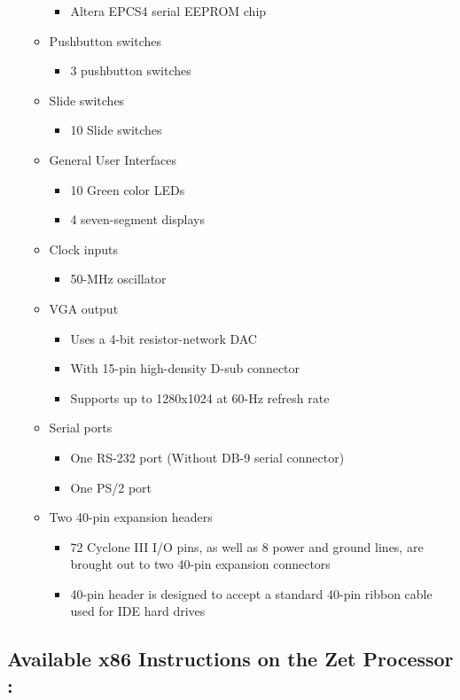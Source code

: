 \documentclass[conference]{IEEEtran}
\begin{document}
\begin{itemize}
\begin{itemize}
\begin{itemize}
		\item Altera EPCS4 serial EEPROM chip
		\end{itemize}
	\item Pushbutton switches
		\begin{itemize}
		\item 3 pushbutton switches
		\end{itemize}
	\item Slide switches
		\begin{itemize}
		\item 10 Slide switches
		\end{itemize}
	\item General User Interfaces
		\begin{itemize}
		\item 10 Green color LEDs
		\item 4 seven-segment displays
		\end{itemize}
	\item Clock inputs
		\begin{itemize}
		\item 50-MHz oscillator
		\end{itemize}
	\item VGA output
		\begin{itemize}
		\item Uses a 4-bit resistor-network DAC
		\item With 15-pin high-density D-sub connector
		\item Supports up to 1280x1024 at 60-Hz refresh rate
		\end{itemize}
	\item Serial ports
		\begin{itemize}
		\item One RS-232 port (Without DB-9 serial connector)
		\item One PS/2 port
		\end{itemize}
	\item Two 40-pin expansion headers
		\begin{itemize}
		\item 72 Cyclone III I/O pins, as well as 8 power and ground lines, are brought out to two 40-pin expansion connectors
		\item40-pin header is designed to accept a standard 40-pin ribbon cable used for IDE hard drives 
		\end{itemize}
	\end{itemize}
\end{itemize}

\label{App:AppendixB}
\subsection{Available x86 Instructions on the Zet Processor \cite{ZetStatus}:}
\end{document}
